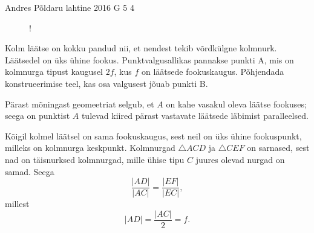 {Andres Põldaru} %
{lahtine} %
{2016} %
{G 5} %
{4} %
{
\ifStatement
\begin{wrapfigure}[8]{r}{0.6\textwidth}
	\vspace{-20pt}
	\begin{resizebox}{0.6\textwidth}{!}{
}
	\end{resizebox}
\end{wrapfigure}

Kolm läätse on kokku pandud nii, et nendest tekib võrdkülgne kolmnurk. Läätsedel on üks ühine fookus. Punktvalgusallikas pannakse punkti A, mis on kolmnurga tipust kaugusel $2f$, kus $f$ on läätsede fookuskaugus. Põhjendada konstrueerimise teel, kas osa valgusest jõuab punkti B.
\fi


\ifHint
Pärast mõningast geomeetriat selgub, et $A$ on kahe vasakul oleva läätse fookuses; seega on punktist $A$ tulevad kiired pärast vastavate läätsede läbimist paralleelsed.
\fi


\ifSolution
Kõigil kolmel läätsel on sama fookuskaugus, sest neil on üks ühine fookuspunkt, milleks on kolmnurga keskpunkt. Kolmnurgad $\triangle ACD$ ja $\triangle CEF$ on sarnased, sest nad on täisnurksed kolmnurgad, mille ühise tipu $C$ juures olevad nurgad on samad. Seega 
\[
\frac{|AD|}{|AC|}=\frac{|EF|}{|EC|},
\]
millest
\[
|AD| = \frac{|AC|}{2} = f.
\]

}
